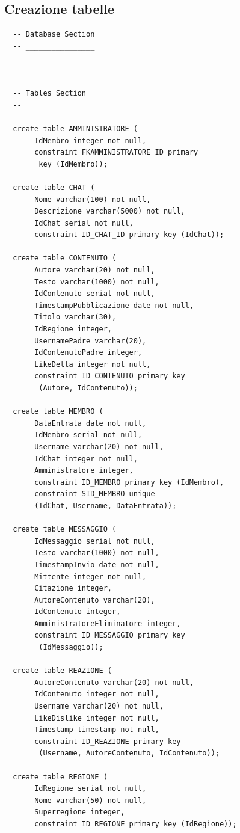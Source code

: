 \documentclass[a4paper,12pt]{report}
\begin{document}
\subsection{Creazione  tabelle}
\begin{lstlisting}
  -- Database Section
  -- ________________ 
  
  
  
  -- Tables Section
  -- _____________ 
  
  create table AMMINISTRATORE (
       IdMembro integer not null,
       constraint FKAMMINISTRATORE_ID primary
        key (IdMembro));
  
  create table CHAT (
       Nome varchar(100) not null,
       Descrizione varchar(5000) not null,
       IdChat serial not null,
       constraint ID_CHAT_ID primary key (IdChat));
  
  create table CONTENUTO (
       Autore varchar(20) not null,
       Testo varchar(1000) not null,
       IdContenuto serial not null,
       TimestampPubblicazione date not null,
       Titolo varchar(30),
       IdRegione integer, 
       UsernamePadre varchar(20),
       IdContenutoPadre integer,
       LikeDelta integer not null,
       constraint ID_CONTENUTO primary key
        (Autore, IdContenuto));
  
  create table MEMBRO (
       DataEntrata date not null,
       IdMembro serial not null,
       Username varchar(20) not null,
       IdChat integer not null,
       Amministratore integer,
       constraint ID_MEMBRO primary key (IdMembro),
       constraint SID_MEMBRO unique 
       (IdChat, Username, DataEntrata));
  
  create table MESSAGGIO (
       IdMessaggio serial not null,
       Testo varchar(1000) not null,
       TimestampInvio date not null,
       Mittente integer not null,
       Citazione integer,
       AutoreContenuto varchar(20),
       IdContenuto integer,
       AmministratoreEliminatore integer,
       constraint ID_MESSAGGIO primary key
        (IdMessaggio));
  
  create table REAZIONE (
       AutoreContenuto varchar(20) not null,
       IdContenuto integer not null,
       Username varchar(20) not null,
       LikeDislike integer not null,
       Timestamp timestamp not null,
       constraint ID_REAZIONE primary key
        (Username, AutoreContenuto, IdContenuto));
  
  create table REGIONE (
       IdRegione serial not null,
       Nome varchar(50) not null,
       Superregione integer,
       constraint ID_REGIONE primary key (IdRegione));
  

\end{lstlisting}
\end{document}
